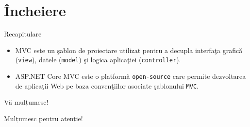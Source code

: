 \documentclass[presentation]{beamer}
\begin{document}
\section{Încheiere}
\label{sec:org15f1a3d}
\begin{frame}[label={sec:orga5569b3},fragile]{Recapitulare}
 \begin{itemize}
\item \alert{MVC} este un şablon de proiectare utilizat pentru a decupla interfaţa grafică (\texttt{view}), datele (\texttt{model}) şi logica aplicaţiei (\texttt{controller}).
\item \alert{ASP.NET Core MVC} este o platformă \texttt{open-source} care permite dezvoltarea de aplicaţii Web pe baza convenţiilor asociate şablonului \texttt{MVC}.
\end{itemize}
\end{frame}
\begin{frame}[label={sec:org288bd26}]{Vă mulțumesc!}
\begin{center}
Mulțumesc pentru atenție!
\end{center}
\end{frame}
\end{document}
